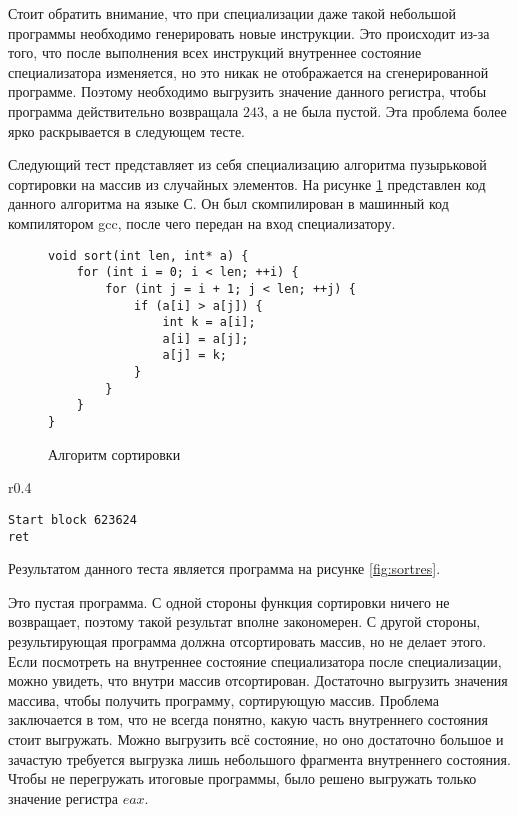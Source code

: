 Стоит обратить внимание, что при специализации даже такой небольшой программы необходимо генерировать новые инструкции. Это происходит из-за того, что после выполнения всех инструкций внутреннее состояние специализатора изменяется, но это никак не отображается на сгенерированной программе. Поэтому необходимо выгрузить значение данного регистра, чтобы программа действительно возвращала $243$, а не была пустой. Эта проблема более ярко раскрывается в следующем тесте.

Следующий тест представляет из себя специализацию алгоритма пузырьковой сортировки на массив из случайных элементов. На рисунке \ref{fig:sort} представлен код данного алгоритма на языке С. Он был скомпилирован в машинный код компилятором gcc, после чего передан на вход специализатору.
\begin{figure}[h]
\begin{lstlisting}[xleftmargin = 20pt]
void sort(int len, int* a) {
    for (int i = 0; i < len; ++i) {
        for (int j = i + 1; j < len; ++j) {
            if (a[i] > a[j]) {
                int k = a[i];
                a[i] = a[j];
                a[j] = k;
            }
        }
    }
}
\end{lstlisting}
\caption{ Алгоритм сортировки}
\label{fig:sort}
\end{figure}
\begin{wrapfigure}{r}{0.4\textwidth}
\begin{lstlisting}[xleftmargin = 20pt]
Start block 623624
ret
\end{lstlisting}
\caption{ Результат специализации}
\label{fig:sortres}
\end{wrapfigure}
Результатом данного теста является программа на рисунке \ref{fig:sortres}.

Это пустая программа. С одной стороны функция сортировки ничего не возвращает, поэтому такой результат вполне закономерен. С другой стороны, результирующая программа должна отсортировать массив, но не делает этого. Если посмотреть на внутреннее состояние специализатора после специализации, можно увидеть, что внутри массив отсортирован. Достаточно выгрузить значения массива, чтобы получить программу, сортирующую массив. Проблема заключается в том, что не всегда понятно, какую часть внутреннего состояния стоит выгружать. Можно выгрузить всё состояние, но оно достаточно большое и зачастую требуется выгрузка лишь небольшого фрагмента внутреннего состояния. Чтобы не перегружать итоговые программы, было решено выгружать только значение регистра $eax$.

